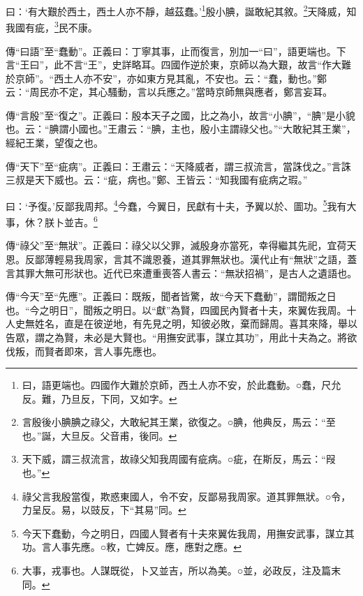 曰：‘有大艱於西土，西土人亦不靜，越茲蠢。’\footnote{曰，語更端也。四國作大難於京師，西土人亦不安，於此蠢動。○蠢，尺允反。難，乃旦反，下同，又如字。}殷小腆，誕敢紀其敘。\footnote{言殷後小腆腆之祿父，大敢紀其王業，欲復之。○腆，他典反，馬云：“至也。”誕，大旦反。父音甫，後同。}天降威，知我國有疵，\footnote{天下威，謂三叔流言，故祿父知我周國有疵病。○疵，在斯反，馬云：“叚也。”}民不康。


{\noindent\zhuan{}\fzbyks 傳“曰語”至“蠢動”。正義曰：丁寧其事，止而復言，別加一“曰”，語更端也。下言“王曰”，此不言“王”，史詳略耳。四國作逆於東，京師以為大艱，故言“作大難於京師”。“西土人亦不安”，亦如東方見其亂，不安也。云：“蠢，動也。”鄭云：“周民亦不定，其心騷動，言以兵應之。”當時京師無與應者，鄭言妄耳。 \par}

{\noindent\zhuan{}\fzbyks 傳“言殷”至“復之”。正義曰：殷本天子之國，比之為小，故言“小腆”，“腆”是小貌也。云：“腆謂小國也。”王肅云：“腆，主也，殷小主謂祿父也。”“大敢紀其王業”，經紀王業，望復之也。 \par}

{\noindent\zhuan{}\fzbyks 傳“天下”至“疵病”。正義曰：王肅云：“天降威者，謂三叔流言，當誅伐之。”言誅三叔是天下威也。云：“疵，病也。”鄭、王皆云：“知我國有疵病之瑕。” \par}

曰：‘予復。’反鄙我周邦。\footnote{祿父言我殷當復，欺惑東國人，令不安，反鄙易我周家。道其罪無狀。○令，力呈反。易，以豉反，下“其易”同。}今蠢，今翼日，民獻有十夫，予翼以於、圖功。\footnote{今天下蠢動，今之明日，四國人賢者有十夫來翼佐我周，用撫安武事，謀立其功。言人事先應。○敉，亡婢反。應，應對之應。}我有大事，休？朕卜並吉。\footnote{大事，戎事也。人謀既從，卜又並吉，所以為美。○並，必政反，注及篇末同。}

{\noindent\zhuan{}\fzbyks 傳“祿父”至“無狀”。正義曰：祿父以父罪，滅殷身亦當死，幸得繼其先祀，宜荷天恩。反鄙薄輕易我周家，言其不識恩養，道其罪無狀也。漢代止有“無狀”之語，蓋言其罪大無可形狀也。近代已來遭重喪答人書云：“無狀招禍”，是古人之遺語也。 \par}

{\noindent\zhuan{}\fzbyks 傳“今天”至“先應”。正義曰：既叛，聞者皆驚，故“今天下蠢動”，謂聞叛之日也。“今之明日”，聞叛之明日。以“獻”為賢，四國民內賢者十夫，來翼佐我周。十人史無姓名，直是在彼逆地，有先見之明，知彼必敗，棄而歸周。喜其來降，舉以告眾，謂之為賢，未必是大賢也。“用撫安武事，謀立其功”，用此十夫為之。將欲伐叛，而賢者即來，言人事先應也。 \par}

